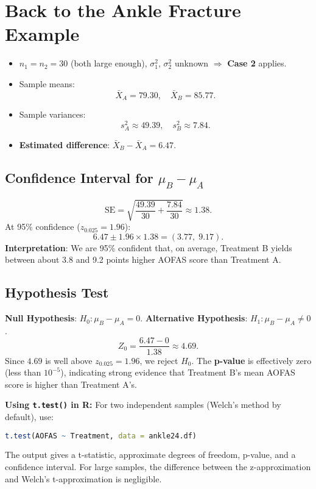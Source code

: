 \documentclass[10pt]{extarticle}
\begin{document}
\bigskip

\section{Back to the Ankle Fracture Example}
\begin{itemize}
    \item $n_1 = n_2 = 30$ (both large enough), $\sigma_1^2$, $\sigma_2^2$ unknown $\Rightarrow$ \textbf{Case 2} applies.
    \item Sample means:
    \[
    \bar{X}_A = 79.30,\quad \bar{X}_B = 85.77.
    \]
    \item Sample variances:
    \[
    s_A^2 \approx 49.39,\quad s_B^2 \approx 7.84.
    \]
    \item \textbf{Estimated difference}: $\bar{X}_B - \bar{X}_A = 6.47$.
\end{itemize}

\subsection{Confidence Interval for $\mu_B - \mu_A$}
\[
\text{SE} = \sqrt{\frac{49.39}{30} + \frac{7.84}{30}} \approx 1.38.
\]
At 95\% confidence ($z_{0.025}=1.96$):
\[
6.47 \pm 1.96 \times 1.38 = (3.77,\; 9.17).
\]
\textbf{Interpretation}: We are 95\% confident that, on average, Treatment B yields between about 3.8 and 9.2 points higher AOFAS score than Treatment A.

\subsection{Hypothesis Test}
\textbf{Null Hypothesis}: $H_0 : \mu_B - \mu_A = 0$.  
\textbf{Alternative Hypothesis}: $H_1 : \mu_B - \mu_A \neq 0$.
\[
Z_0 = \frac{6.47 - 0}{1.38} \approx 4.69.
\]
Since $4.69$ is well above $z_{0.025}=1.96$, we reject $H_0$. The \textbf{p-value} is effectively zero (less than $10^{-5}$), indicating strong evidence that Treatment B’s mean AOFAS score is higher than Treatment A’s.

\bigskip

\noindent\textbf{Using \texttt{t.test()} in R:}  
For two independent samples (Welch’s method by default), use:
\begin{lstlisting}[language=r]
t.test(AOFAS ~ Treatment, data = ankle24.df)
\end{lstlisting}
The output gives a t-statistic, approximate degrees of freedom, p-value, and a confidence interval. For large samples, the difference between the z-approximation and Welch’s t-approximation is negligible.
\end{document}
